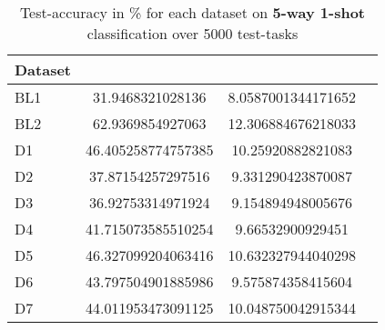 \begin{table}[h]
\centering
\caption{Test-accuracy in \% for each dataset on \textbf{5-way 1-shot} classification over 5000 test-tasks}
\label{accfiveone}
\begin{tabular}{l *{3}{S}}
        \hline
        Dataset &  &  & 
        \\
        \hline
        BL1  & 31.9468321028136 & 8.0587001344171652 &  
        \\
        BL2  & 62.9369854927063 & 12.306884676218033 & 
        \\
        D1  & 46.405258774757385 & 10.25920882821083 & 
        \\
        D2  & 37.87154257297516 & 9.331290423870087 &         
        \\
        D3  & 36.92753314971924 & 9.154894948005676 & 
        \\
        D4  & 41.715073585510254 & 9.66532900929451 & 
        \\
        D5  & 46.327099204063416 & 10.632327944040298 & 
        \\        
        D6  & 43.797504901885986 & 9.575874358415604 & 
        \\
        D7  & 44.011953473091125 & 10.048750042915344 & 
        \\ \hline   
    \end{tabular}
\end{table}

